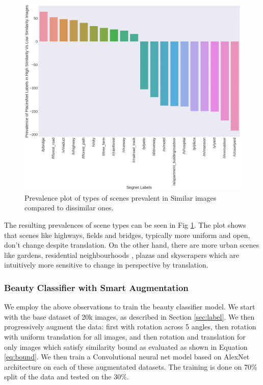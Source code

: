 \begin{figure}[ht]
	\centering
	\includegraphics[width=\columnwidth]{Plot/SimilarityPlacesPrevalence.png}
	\caption{Prevalence plot of types of scenes prevalent in Similar images compared to dissimilar ones.}
	\label{fig:augmentationSimilarity}
\end{figure}

The resulting prevalences of scene types can be seen in Fig \ref{fig:augmentationSimilarity}. The plot shows that scenes like highways, fields and bridges, typically more uniform and open, 
don't change despite translation. On the other hand, there are more urban scenes like gardens, residential neighbourhoods , plazas and skyscrapers which are intuitively more sensitive to change in perspective by translation. 

\subsubsection{Beauty Classifier with Smart Augmentation}
We employ the above observations to train the beauty classifier model. We start with  the base dataset of 20k images, as described in Section \ref{sec:label}. We then progressively augment the data: first with rotation across 5 angles, then rotation with uniform translation for all images, and then rotation and translation for only images which satisfy similarity bound as evaluated as shown in Equation \ref{eq:bound}. 
We then train a Convolutional neural net model based on AlexNet architecture \cite{szegedy2015going} on each of these augmentated datasets. The training is done on 70\% split of the data and tested on the 30\%. 


